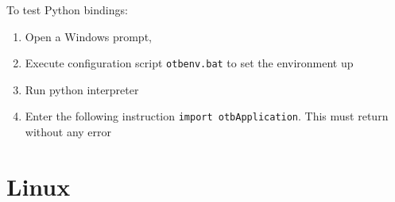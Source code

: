 \documentclass[10pt,a4paper]{article}
\begin{document}
To test Python bindings:

\begin{enumerate}
 \item Open a Windows prompt,
 \item Execute configuration script \verb?otbenv.bat? to set the environment up
 \item Run python interpreter
 \item Enter the following instruction \verb?import otbApplication?. This must return without any error
\end{enumerate}

\clearpage
\section{Linux}
\end{document}
